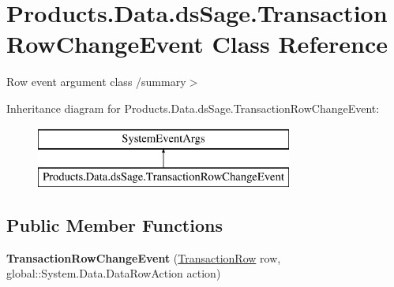 \hypertarget{class_products_1_1_data_1_1ds_sage_1_1_transaction_row_change_event}{}\section{Products.\+Data.\+ds\+Sage.\+Transaction\+Row\+Change\+Event Class Reference}
\label{class_products_1_1_data_1_1ds_sage_1_1_transaction_row_change_event}


Row event argument class /summary$>$  


Inheritance diagram for Products.\+Data.\+ds\+Sage.\+Transaction\+Row\+Change\+Event\+:\begin{figure}[H]
\begin{center}
\leavevmode
\includegraphics[height=2.000000cm]{class_products_1_1_data_1_1ds_sage_1_1_transaction_row_change_event}
\end{center}
\end{figure}
\subsection*{Public Member Functions}
\begin{DoxyCompactItemize}
\item 
{\bfseries Transaction\+Row\+Change\+Event} (\hyperlink{class_products_1_1_data_1_1ds_sage_1_1_transaction_row}{Transaction\+Row} row, global\+::\+System.\+Data.\+Data\+Row\+Action action)\hypertarget{class_products_1_1_data_1_1ds_sage_1_1_transaction_row_change_event_aa173c73f7e5d4412c1c8c88727ff8e38}{}\label{class_products_1_1_data_1_1ds_sage_1_1_transaction_row_change_event_aa173c73f7e5d4412c1c8c88727ff8e38}

\end{DoxyCompactItemize}
